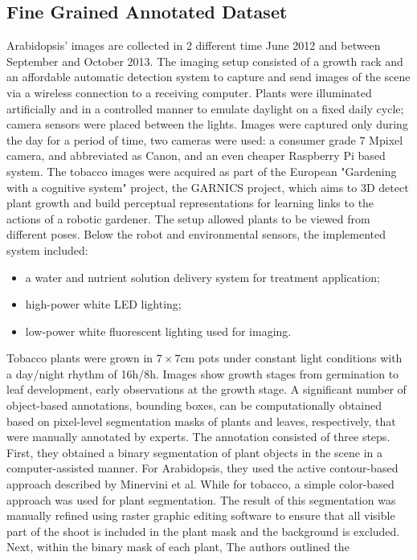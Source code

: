 \subsection{Fine Grained Annotated Dataset}
Arabidopsis' images\cite{MINERVINI201680} are collected in 2 different time June 2012 and between September and October 2013. The imaging setup consisted of a growth rack
and an affordable automatic detection system to capture and send images of the scene via a wireless connection to a receiving computer. Plants were illuminated artificially
and in a controlled manner to emulate daylight on a fixed daily cycle; camera sensors were placed between the lights. Images were captured only during the day for a period
of time, two cameras were used: a consumer grade 7 Mpixel camera, and abbreviated as Canon, and an even cheaper Raspberry Pi based system. The tobacco images were acquired
as part of the European "Gardening with a cognitive system" project, the GARNICS project, which aims to 3D detect plant growth and build perceptual representations for
learning links to the actions of a robotic gardener. The setup allowed plants to be viewed from different poses. Below the robot and environmental sensors, the implemented
system included:
\begin{itemize}
\item a water and nutrient solution delivery system for treatment application;
\item high-power white LED lighting;
\item low-power white fluorescent lighting used for imaging.
\end{itemize}
Tobacco plants were grown in $7\times7$cm pots under constant light conditions with a day/night rhythm of 16h/8h. Images show growth stages from germination to leaf
development, early observations at the growth stage. A significant number of object-based annotations, bounding boxes, can be computationally obtained based on
pixel-level segmentation masks of plants and leaves, respectively, that were manually annotated by experts. The annotation consisted of three steps. First, they obtained
a binary segmentation of plant objects in the scene in a computer-assisted manner. For Arabidopsis, they used the active contour-based approach described by Minervini et al.
While for tobacco, a simple color-based approach was used for plant segmentation. The result of this segmentation was manually refined using raster graphic editing software
to ensure that all visible part of the shoot is included in the plant mask and the background is excluded. Next, within the binary mask of each plant, The authors outlined the
